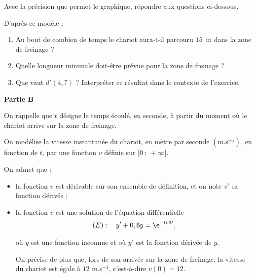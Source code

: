 \medskip

Avec la précision que permet le graphique, répondre aux questions ci-dessous.

D'après ce modèle :

\medskip

\begin{enumerate}
\item Au bout de combien de temps le chariot aura-t-il parcouru $15$~m dans la zone de freinage ?
\item Quelle longueur minimale doit-être prévue pour la zone de freinage ?
\item Que vaut $d'(4,7)$ ? Interpréter ce résultat dans le contexte de l'exercice.
\end{enumerate}

\begin{center}\textbf{Partie B} \end{center}

On rappelle que $t$ désigne le temps écoulé, en seconde, à partir du moment où le chariot arrive sur la zone de freinage.

On modélise la vitesse instantanée du chariot, en mètre par seconde $\left(\text{m}.\text{s}^{-1}\right)$, en fonction de $t$, par une fonction $v$ définie sur $[0~;~+\infty[$.

On admet que :

\begin{itemize}[label=$\bullet~$]
\item la fonction $v$ est dérivable sur son ensemble de définition, et on note $v'$ sa
fonction dérivée ;
\item la fonction $v$ est une solution de l'équation différentielle 
\[(E) :\quad y' + 0,6y = \e^{-0,6t},\]

où $y$ est une fonction inconnue et où $y'$ est la fonction dérivée de $y$.

On précise de plus que, lors de son arrivée sur la zone de freinage, la vitesse du chariot est égale à $12$ m.s$^{-1}$, c'est-à-dire $v(0) = 12$.

\end{itemize}

\medskip


